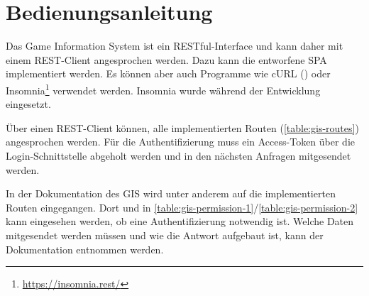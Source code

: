 \section{Bedienungsanleitung}

Das Game Information System ist ein RESTful-Interface und kann daher mit einem REST-Client angesprochen werden. Dazu kann die entworfene SPA implementiert werden. Es können aber auch Programme wie cURL () oder Insomnia\footnote{\url{https://insomnia.rest/}} verwendet werden. Insomnia wurde während der Entwicklung eingesetzt.

Über einen REST-Client können, alle implementierten Routen (\autoref{table:gis-routes}) angesprochen werden. Für die Authentifizierung muss ein Access-Token über die Login-Schnittstelle abgeholt werden und in den nächsten Anfragen mitgesendet werden.

In der Dokumentation des GIS wird unter anderem auf die implementierten Routen eingegangen. Dort und in \autoref{table:gis-permission-1}/\ref{table:gis-permission-2} kann eingesehen werden, ob eine Authentifizierung notwendig ist. Welche Daten mitgesendet werden müssen und wie die Antwort aufgebaut ist, kann der Dokumentation entnommen werden.